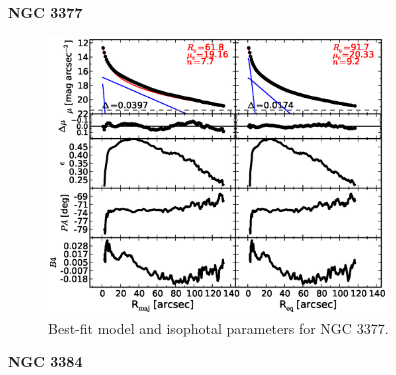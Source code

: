 \documentclass[preprint2]{emulateapj}
\newcommand{\fitfigurewidth}{0.8\textwidth}
\begin{document}
  \clearpage\newpage\noindent

  {\bf NGC 3377 \\}

  \begin{figure}[h]
  \begin{center}
  \includegraphics[width=\fitfigurewidth]{images/n3377_1Dfit.eps}
  \caption{Best-fit model and isophotal parameters for NGC 3377.}
  \end{center}
  \end{figure}


  \clearpage\newpage\noindent
  {\bf NGC 3384 \\}
\end{document}
